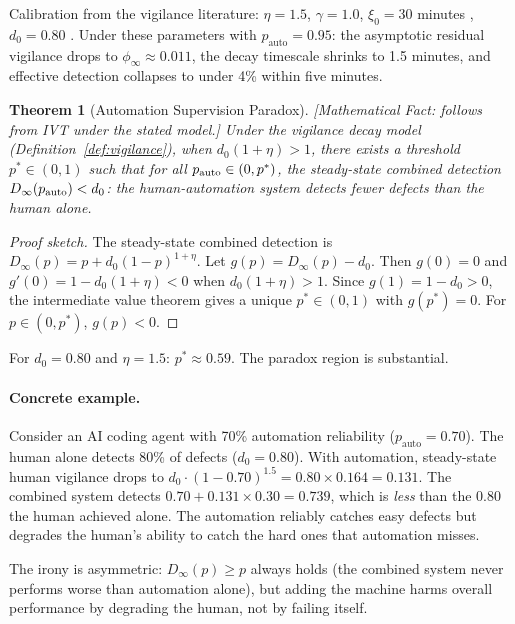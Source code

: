 \documentclass[11pt, a4paper]{googledeepmind}
\newtheorem{theorem}{Theorem}[section]
\begin{document}
Calibration from the vigilance literature: $\eta = 1.5$, $\gamma = 1.0$, $\xi_0 = 30$ minutes \citep{mackworth1948breakdown, see1995meta}, $d_0 = 0.80$ \citep{cohen2006best}. Under these parameters with $p_{\text{auto}} = 0.95$: the asymptotic residual vigilance drops to $\phi_\infty \approx 0.011$, the decay timescale shrinks to 1.5 minutes, and effective detection collapses to under 4\% within five minutes.

\begin{theorem}[Automation Supervision Paradox]
\emph{[Mathematical Fact: follows from IVT under the stated model.]}
\label{thm:paradox}
Under the vigilance decay model (Definition~\ref{def:vigilance}), when $d_0(1+\eta) > 1$, there exists a threshold $p^* \in (0,1)$ such that for all $p_{\textup{auto}} \in (0, p^*)$, the steady-state combined detection $D_\infty(p_{\textup{auto}}) < d_0$: the human-automation system detects fewer defects than the human alone.
\end{theorem}

\begin{proof}[Proof sketch]
The steady-state combined detection is $D_\infty(p) = p + d_0(1-p)^{1+\eta}$. Let $g(p) = D_\infty(p) - d_0$. Then $g(0) = 0$ and $g'(0) = 1 - d_0(1+\eta) < 0$ when $d_0(1+\eta) > 1$. Since $g(1) = 1 - d_0 > 0$, the intermediate value theorem gives a unique $p^* \in (0,1)$ with $g(p^*) = 0$. For $p \in (0, p^*)$, $g(p) < 0$.
\end{proof}

For $d_0 = 0.80$ and $\eta = 1.5$: $p^* \approx 0.59$. The paradox region is substantial.

\paragraph{Concrete example.} Consider an AI coding agent with 70\% automation reliability ($p_{\text{auto}} = 0.70$). The human alone detects 80\% of defects ($d_0 = 0.80$). With automation, steady-state human vigilance drops to $d_0 \cdot (1-0.70)^{1.5} = 0.80 \times 0.164 = 0.131$. The combined system detects $0.70 + 0.131 \times 0.30 = 0.739$, which is \emph{less} than the 0.80 the human achieved alone. The automation reliably catches easy defects but degrades the human's ability to catch the hard ones that automation misses.

The irony is asymmetric: $D_\infty(p) \geq p$ always holds (the combined system never performs worse than automation alone), but adding the machine harms overall performance by degrading the human, not by failing itself.
\end{document}
